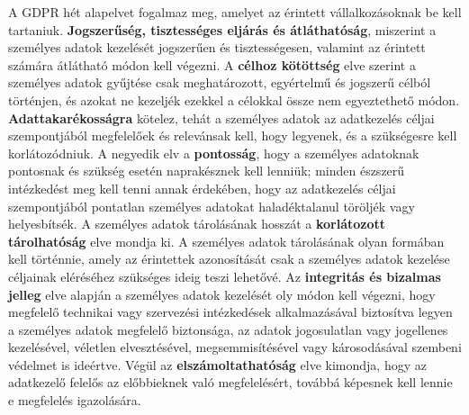 A GDPR hét alapelvet fogalmaz meg, amelyet az érintett vállalkozásoknak be kell tartaniuk. \textbf{Jogszerűség, tisztességes eljárás és átláthatóság}, miszerint a személyes adatok kezelését jogszerűen és tisztességesen, valamint az érintett számára átlátható módon kell végezni. A \textbf{célhoz kötöttség} elve szerint a személyes adatok gyűjtése csak meghatározott, egyértelmű és jogszerű célból történjen, és azokat ne kezeljék ezekkel a célokkal össze nem egyeztethető módon. \textbf{Adattakarékosságra} kötelez, tehát a személyes adatok az adatkezelés céljai szempontjából megfelelőek és relevánsak kell, hogy legyenek, és a szükségesre kell korlátozódniuk. A negyedik elv a \textbf{pontosság}, hogy a személyes adatoknak pontosnak és szükség esetén naprakésznek kell lenniük; minden észszerű intézkedést meg kell tenni annak érdekében, hogy az adatkezelés céljai szempontjából pontatlan személyes adatokat haladéktalanul töröljék vagy helyesbítsék. A személyes adatok tárolásának hosszát a \textbf{korlátozott tárolhatóság} elve mondja ki. A személyes adatok tárolásának olyan formában kell történnie, amely az érintettek azonosítását csak a személyes adatok kezelése céljainak eléréséhez szükséges ideig teszi lehetővé. Az \textbf{integritás és bizalmas jelleg} elve alapján a személyes adatok kezelését oly módon kell végezni, hogy megfelelő technikai vagy szervezési intézkedések alkalmazásával biztosítva legyen a személyes adatok megfelelő biztonsága, az adatok jogosulatlan vagy jogellenes kezelésével, véletlen elvesztésével, megsemmisítésével vagy károsodásával szembeni védelmet is ideértve. Végül az \textbf{elszámoltathatóság} elve kimondja, hogy az adatkezelő felelős az előbbieknek való megfelelésért, továbbá képesnek kell lennie e megfelelés igazolására.

